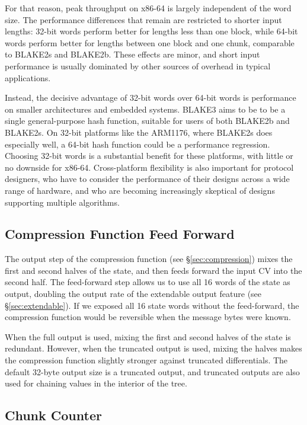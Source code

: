 \documentclass[11pt,notitlepage,a4paper]{article}
\begin{document}
For that reason, peak throughput on x86-64 is largely independent of the word
size. The performance differences that remain are restricted to shorter input
lengths: 32-bit words perform better for lengths less than one block, while
64-bit words perform better for lengths between one block and one chunk,
comparable to BLAKE2s and BLAKE2b. These effects are minor, and short input
performance is usually dominated by other sources of overhead in typical
applications.

Instead, the decisive advantage of 32-bit words over 64-bit words is
performance on smaller architectures and embedded systems. BLAKE3 aims to be to
be a single general-purpose hash function, suitable for users of both BLAKE2b
and BLAKE2s. On 32-bit platforms like the ARM1176, where BLAKE2s does
especially well, a 64-bit hash function could be a performance regression.
Choosing 32-bit words is a substantial benefit for these platforms, with little
or no downside for x86-64. Cross-platform flexibility is also important for
protocol designers, who have to consider the performance of their designs
across a wide range of hardware, and who are becoming increasingly skeptical of
designs supporting multiple algorithms.\cite{WG}

\subsection{Compression Function Feed Forward}\label{sec:feedforward}

The output step of the compression function (see \S\ref{sec:compression}) mixes
the first and second halves of the state, and then feeds forward the input CV
into the second half. The feed-forward step allows us to use all 16 words of
the state as output, doubling the output rate of the extendable output feature
(see \S\ref{sec:extendable}). If we exposed all 16 state words without the
feed-forward, the compression function would be reversible when the message
bytes were known.

When the full output is used, mixing the first and second halves of the state
is redundant. However, when the truncated output is used, mixing the halves
makes the compression function slightly stronger against truncated
differentials. The default 32-byte output size is a truncated output, and
truncated outputs are also used for chaining values in the interior of the
tree.

\subsection{Chunk Counter}\label{sec:chunkcounter}
\end{document}
